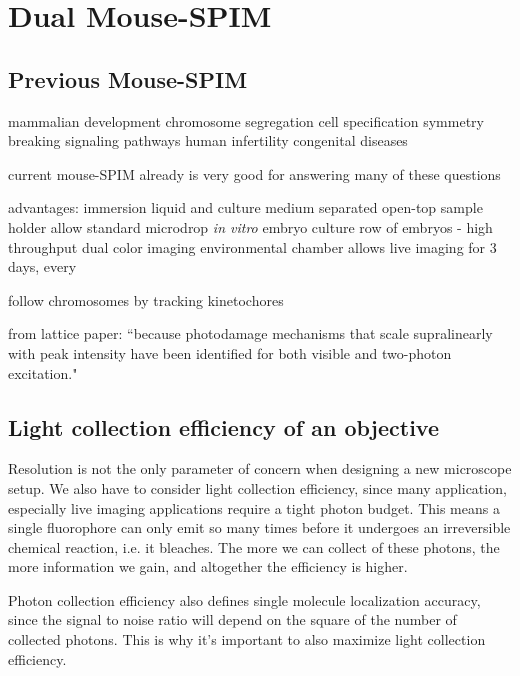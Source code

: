 

\chapter{Dual Mouse-SPIM}

\graphicspath{{./figures/2_DualMouse/}}

\section{Previous Mouse-SPIM}
  mammalian development
  chromosome segregation
  cell specification
  symmetry breaking
  signaling pathways
  human infertility
  congenital diseases 

  current mouse-SPIM \cite{strnad_inverted_2016} already is very good for answering many of these questions

  advantages:
    immersion liquid and culture medium separated
    open-top sample holder allow standard microdrop \textit{in vitro} embryo culture
    row of embryos - high throughput
    dual color imaging
    environmental chamber allows live imaging for 3 days, every 

  follow chromosomes by tracking kinetochores

  from lattice paper: ``because photodamage mechanisms that scale supralinearly with peak intensity have been identified for both visible \cite{donnert_major_2007} and two-photon \cite{ji_high-speed_2008} excitation."



\section{Light collection efficiency of an objective}
  Resolution is not the only parameter of concern when designing a new microscope setup. We also have to consider light collection efficiency, since many application, especially live imaging applications require a tight photon budget. This means a single fluorophore can only emit so many times before it undergoes an irreversible chemical reaction, i.e. it bleaches. The more we can collect of these photons, the more information we gain, and altogether the efficiency is higher.

  Photon collection efficiency also defines single molecule localization accuracy, since the signal to noise ratio will depend on the square of the number of collected photons. This is why it's important to also maximize light collection efficiency.

